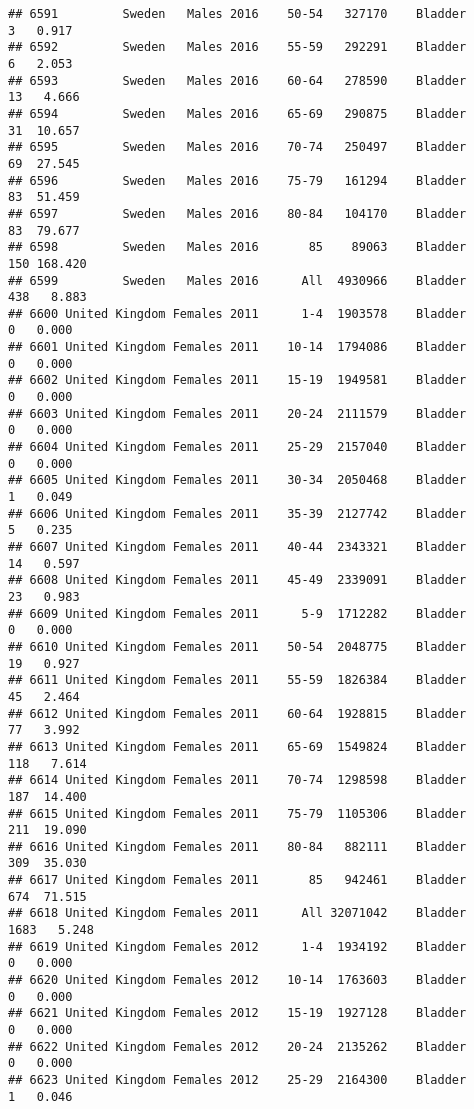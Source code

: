 \documentclass[
]{article}
\begin{document}
\begin{verbatim}
## 6591         Sweden   Males 2016    50-54   327170    Bladder      3   0.917
## 6592         Sweden   Males 2016    55-59   292291    Bladder      6   2.053
## 6593         Sweden   Males 2016    60-64   278590    Bladder     13   4.666
## 6594         Sweden   Males 2016    65-69   290875    Bladder     31  10.657
## 6595         Sweden   Males 2016    70-74   250497    Bladder     69  27.545
## 6596         Sweden   Males 2016    75-79   161294    Bladder     83  51.459
## 6597         Sweden   Males 2016    80-84   104170    Bladder     83  79.677
## 6598         Sweden   Males 2016       85    89063    Bladder    150 168.420
## 6599         Sweden   Males 2016      All  4930966    Bladder    438   8.883
## 6600 United Kingdom Females 2011      1-4  1903578    Bladder      0   0.000
## 6601 United Kingdom Females 2011    10-14  1794086    Bladder      0   0.000
## 6602 United Kingdom Females 2011    15-19  1949581    Bladder      0   0.000
## 6603 United Kingdom Females 2011    20-24  2111579    Bladder      0   0.000
## 6604 United Kingdom Females 2011    25-29  2157040    Bladder      0   0.000
## 6605 United Kingdom Females 2011    30-34  2050468    Bladder      1   0.049
## 6606 United Kingdom Females 2011    35-39  2127742    Bladder      5   0.235
## 6607 United Kingdom Females 2011    40-44  2343321    Bladder     14   0.597
## 6608 United Kingdom Females 2011    45-49  2339091    Bladder     23   0.983
## 6609 United Kingdom Females 2011      5-9  1712282    Bladder      0   0.000
## 6610 United Kingdom Females 2011    50-54  2048775    Bladder     19   0.927
## 6611 United Kingdom Females 2011    55-59  1826384    Bladder     45   2.464
## 6612 United Kingdom Females 2011    60-64  1928815    Bladder     77   3.992
## 6613 United Kingdom Females 2011    65-69  1549824    Bladder    118   7.614
## 6614 United Kingdom Females 2011    70-74  1298598    Bladder    187  14.400
## 6615 United Kingdom Females 2011    75-79  1105306    Bladder    211  19.090
## 6616 United Kingdom Females 2011    80-84   882111    Bladder    309  35.030
## 6617 United Kingdom Females 2011       85   942461    Bladder    674  71.515
## 6618 United Kingdom Females 2011      All 32071042    Bladder   1683   5.248
## 6619 United Kingdom Females 2012      1-4  1934192    Bladder      0   0.000
## 6620 United Kingdom Females 2012    10-14  1763603    Bladder      0   0.000
## 6621 United Kingdom Females 2012    15-19  1927128    Bladder      0   0.000
## 6622 United Kingdom Females 2012    20-24  2135262    Bladder      0   0.000
## 6623 United Kingdom Females 2012    25-29  2164300    Bladder      1   0.046

\end{verbatim}
\end{document}
